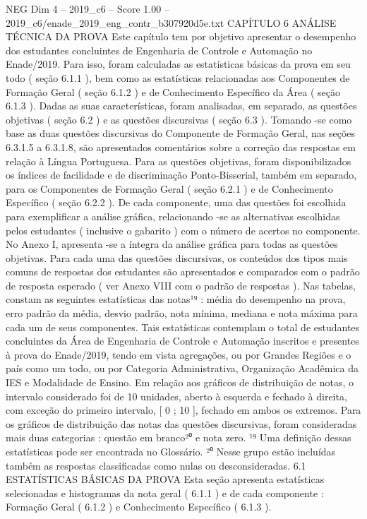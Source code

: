 \begin{textsample}{NEG Dim 4 – 2019\_c6 – Score 1.00 – 2019\_c6/enade\_2019\_eng\_contr\_b307920d5e.txt}  \label{ex:f4_neg_261}
CAPÍTULO 6 ANÁLISE TÉCNICA DA PROVA Este capítulo tem por objetivo apresentar o desempenho dos estudantes concluintes de Engenharia de Controle e Automação no Enade/2019.
Para isso, foram calculadas as estatísticas básicas da prova em seu todo ( seção 6.1.1 ), bem como as estatísticas relacionadas aos Componentes de Formação Geral ( seção 6.1.2 ) e de Conhecimento Específico da Área ( seção 6.1.3 ).
Dadas as suas características, foram analisadas, em separado, as questões objetivas ( seção 6.2 ) e as questões discursivas ( seção 6.3 ).
Tomando -se como base as duas questões discursivas do Componente de Formação Geral, nas seções 6.3.1.5 a 6.3.1.8, são apresentados comentários sobre a correção das respostas em relação à Língua Portuguesa.
Para as questões objetivas, foram disponibilizados os índices de facilidade e de discriminação Ponto-Bisserial, também em separado, para os Componentes de Formação Geral ( seção 6.2.1 ) e de Conhecimento Específico ( seção 6.2.2 ).
De cada componente, uma das questões foi escolhida para exemplificar a análise gráfica, relacionando -se as alternativas escolhidas pelos estudantes ( inclusive o gabarito ) com o número de acertos no componente.
No Anexo I, apresenta -se a íntegra da análise gráfica para todas as questões objetivas.
Para cada uma das questões discursivas, os conteúdos dos tipos mais comuns de respostas dos estudantes são apresentados e comparados com o padrão de resposta esperado ( ver Anexo VIII com o padrão de respostas ).
Nas tabelas, constam as seguintes estatísticas das notas¹⁹ : média do desempenho na prova, erro padrão da média, desvio padrão, nota mínima, mediana e nota máxima para cada um de seus componentes.
Tais estatísticas contemplam o total de estudantes concluintes da Área de Engenharia de Controle e Automação inscritos e presentes à prova do Enade/2019, tendo em vista agregações, ou por Grandes Regiões e o país como um todo, ou por Categoria Administrativa, Organização Acadêmica da IES e Modalidade de Ensino.
Em relação aos gráficos de distribuição de notas, o intervalo considerado foi de 10 unidades, aberto à esquerda e fechado à direita, com exceção do primeiro intervalo, [ 0 ; 10 ], fechado em ambos os extremos.
Para os gráficos de distribuição das notas das questões discursivas, foram consideradas mais duas categorias : questão em branco²⁰ e nota zero. ¹⁹ Uma definição dessas estatísticas pode ser encontrada no Glossário. ²⁰ Nesse grupo estão incluídas também as respostas classificadas como nulas ou desconsideradas. 6.1 ESTATÍSTICAS BÁSICAS DA PROVA Esta seção apresenta estatísticas selecionadas e histogramas da nota geral ( 6.1.1 ) e de cada componente : Formação Geral ( 6.1.2 ) e Conhecimento Específico ( 6.1.3 ).

\end{textsample}
